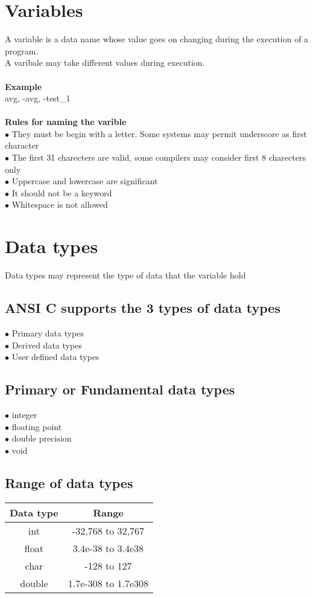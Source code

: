 \documentclass{article}
\begin{document}
	\section{Variables}
	A variable is a data name whose value goes on changing during the execution of a program. \\
	A varibale may take different values during execution.
	\\ \\
	\textbf{Example} \\
	avg, -avg, -test\_1
	\\ \\
	\textbf{Rules for naming the varible} \\
	$\bullet$ They must be begin with a letter. Some systems may permit underscore as first character \\
	$\bullet$ The first 31 charecters are valid, some compilers may consider first 8 charecters only \\
	$\bullet$ Uppercase and lowercase are significant \\
	$\bullet$ It should not be a keyword \\
	$\bullet$ Whitespace is not allowed
	
	\newpage
	
	\section{Data types}
	Data types may represent the type of data that the variable hold
	
	\subsection{ANSI C supports the 3 types of data types}
	$\bullet$ Primary data types \\
	$\bullet$ Derived data types \\
	$\bullet$ User defined data types
	
	\subsection{Primary or Fundamental data types}
	$\bullet$ integer \\
	$\bullet$ floating point \\
	$\bullet$ double precision \\
	$\bullet$ void
	
	\subsection{Range of data types}
	\begin{tabular}{|c|c|}
		\hline
		Data type & Range \\
		\hline
		int & -32,768 to 32,767 \\
		float & 3.4e-38 to 3.4e38 \\
		char & -128 to 127 \\
		double & 1.7e-308 to 1.7e308 \\
		\hline
	\end{tabular}
\end{document}
